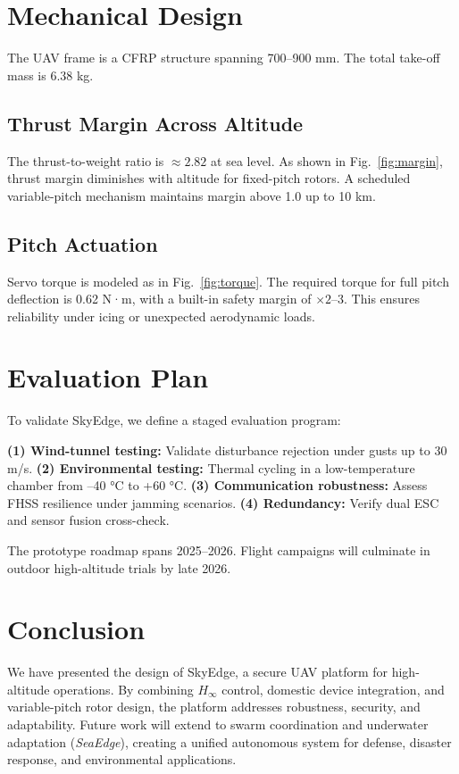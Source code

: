 \documentclass[conference]{IEEEtran}
\begin{document}
\section{Mechanical Design}
The UAV frame is a CFRP structure spanning 700--900 mm. The total take-off mass is 6.38 kg.  

\subsection{Thrust Margin Across Altitude}
The thrust-to-weight ratio is $\approx 2.82$ at sea level. As shown in Fig.~\ref{fig:margin}, thrust margin diminishes with altitude for fixed-pitch rotors. A scheduled variable-pitch mechanism maintains margin above 1.0 up to 10 km.  

\subsection{Pitch Actuation}
Servo torque is modeled as in Fig.~\ref{fig:torque}. The required torque for full pitch deflection is 0.62 N·m, with a built-in safety margin of $\times 2$--3. This ensures reliability under icing or unexpected aerodynamic loads.  

\section{Evaluation Plan}
To validate SkyEdge, we define a staged evaluation program:  

\textbf{(1) Wind-tunnel testing:} Validate disturbance rejection under gusts up to 30 m/s.  
\textbf{(2) Environmental testing:} Thermal cycling in a low-temperature chamber from –40 °C to +60 °C.  
\textbf{(3) Communication robustness:} Assess FHSS resilience under jamming scenarios.  
\textbf{(4) Redundancy:} Verify dual ESC and sensor fusion cross-check.  

The prototype roadmap spans 2025–2026. Flight campaigns will culminate in outdoor high-altitude trials by late 2026.  

\section{Conclusion}
We have presented the design of SkyEdge, a secure UAV platform for high-altitude operations. By combining $H_\infty$ control, domestic device integration, and variable-pitch rotor design, the platform addresses robustness, security, and adaptability. Future work will extend to swarm coordination and underwater adaptation (\emph{SeaEdge}), creating a unified autonomous system for defense, disaster response, and environmental applications.  
\end{document}
